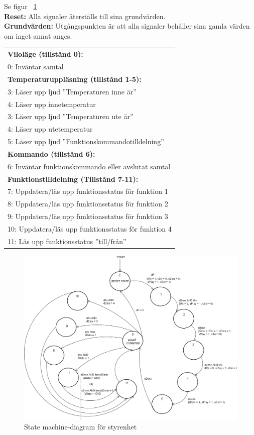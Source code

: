 \documentclass[a4paper,11pt]{article}
\begin{document}
			Se figur ~\ref{fig:CUSM}\\
			{\bf Reset:} Alla signaler återställs till sina grundvärden.\\
			{\bf Grundvärden:} Utgångspunkten är att alla signaler behåller sina gamla värden om inget annat anges.\\
			\begin{tabular}{l}
				\\{\bf Viloläge (tillstånd 0):}\\
				0: Inväntar samtal\\
				{\bf Temperaturuppläsning (tillstånd 1-5):}\\
				3: Läser upp ljud ''Temperaturen inne är''\\
				4: Läser upp innetemperatur\\
				3: Läser upp ljud ''Temperaturen ute är''\\
				4: Läser upp utetemperatur\\
				5: Läser upp ljud ''Funktionskommandotilldelning''\\
				{\bf Kommando (tillstånd 6):}\\
				6: Inväntar funktionskommando eller avslutat samtal\\
				{\bf Funktionstilldelning (Tillstånd 7-11):}\\
				7: Uppdatera/läs upp funktionsstatus för funktion 1\\
				8: Uppdatera/läs upp funktionsstatus för funktion 2\\
				9: Uppdatera/läs upp funktionsstatus för funktion 3\\
				10: Uppdatera/läs upp funktionsstatus för funktion 4\\
				11: Läs upp funktionsstatus ''till/från''\\
			\end{tabular}

	\begin{figure}[H]
	  \centering
	      \includegraphics[scale=0.4, angle=0]{ControlUnitStateMachineDiagram.png}
	  	\caption{State machine-diagram för styrenhet}
		\label{fig:CUSM}
	\end{figure}
	
\end{document}
